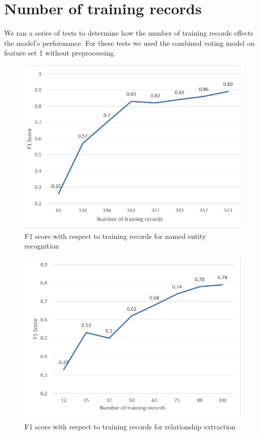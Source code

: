 \documentclass[11pt,oneside]{book}
\begin{document}
\section{Number of training records}
We ran a series of tests to determine how the number of training records effects the model's performance. For these tests we used the combined voting model on feature set 1 without preprocessing.

\begin{figure}[!htbp]
\centering
\includegraphics[scale=0.75]{images/ner_changing_records.JPG}
\caption{F1 score with respect to training records for named entity recognition}
\label{fig:ner_changing_records}
\end{figure}

\begin{figure}[!htbp]
\centering
\includegraphics[scale=0.75]{images/re_changing_records.JPG}
\caption{F1 score with respect to training records for relationship extraction}
\label{fig:re_changing_records}
\end{figure}
\end{document}
